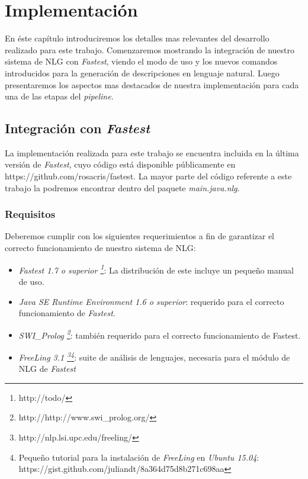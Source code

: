 \chapter{Implementación}
\label{cap:implementacion}

En éste capítulo introduciremos los detalles mas relevantes del desarrollo realizado para este trabajo. Comenzaremos mostrando la integración de nuestro sistema de NLG con \textit{Fastest}, viendo el modo de uso y los nuevos comandos introducidos para la generación de descripciones en lenguaje natural. Luego presentaremos los aspectos mas destacados de nuestra implementación para cada una de las etapas del \emph{pipeline}.

\section{Integración con \emph{Fastest}}

La implementación realizada para este trabajo se encuentra incluida en la última versión de \emph{Fastest}, cuyo código está disponible públicamente en https://github.com/rosacris/fastest. La mayor parte del código referente a este trabajo la podremos encontrar dentro del paquete \textit{main.java.nlg}.

\subsection*{Requisitos}

Deberemos cumplir con los siguientes requerimientos a fin de garantizar el correcto funcionamiento de nuestro sistema de NLG:
\begin{itemize}
 \item  \emph{Fastest 1.7 o superior \footnote{http://todo/}}: La distribución de este incluye un pequeño manual de uso.
 \item  \emph{Java SE Runtime Environment 1.6 o superior}: requerido para el correcto funcionamiento de \emph{Fastest}.
 \item  \emph{SWI\_Prolog \footnote{http://http://www.swi\_prolog.org/}}: también requerido para el correcto funcionamiento de Fastest.
 \item  \emph{FreeLing 3.1 \footnote{http://nlp.lsi.upc.edu/freeling/}\footnote{Pequeño tutorial para la instalación de \emph{FreeLing} en \emph{Ubuntu 15.04}: https://gist.github.com/juliandt/8a364d75d8b271c698aa}}: suite de análisis de lenguajes, necesaria para el módulo de NLG de \emph{Fastest}
\end{itemize}


